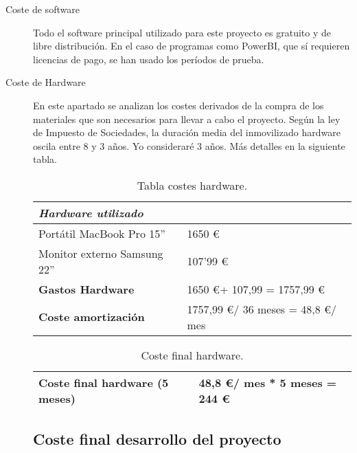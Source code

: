 \begin{description}
	\item[Coste de software] Todo el software principal utilizado para este proyecto es gratuito y de libre distribución. En el caso de programas como PowerBI, que sí requieren licencias de pago, se han usado los períodos de prueba.
	
	\item[Coste de Hardware] En este apartado se analizan los costes derivados de la compra de los materiales que son necesarios para llevar a cabo el proyecto. Según la ley de Impuesto de Sociedades, la duración media del inmovilizado  hardware oscila entre 8 y 3 a\~nos. Yo consideraré 3 años. Más detalles en la siguiente tabla.  
	
	\begin{table}[htbp]
		\begin{center}
			\begin{tabular}{|l|l|}
				\hline
				\emph{Hardware utilizado}&  \\
				\hline \hline
				Portátil MacBook Pro 15'' & 1650 \euro  \\ \hline
				Monitor externo Samsung 22'' &    107'99 \euro\\ \hline
				\textbf{Gastos Hardware}  &   1650 \euro + 107,99  =  1757,99 \euro \\ \hline
				\textbf{Coste amortización}  &  1757,99 \euro  / 36 meses = 48,8 \euro / mes  \\ \hline
			\end{tabular}
			\caption{Tabla costes hardware.}
			\label{tabla:hardware}
		\end{center}
	\end{table}
	
	\begin{table}[htbp]
		\begin{center}
			\begin{tabular}{|l|l|}
				\hline
				\textbf{Coste final hardware} (5 meses)  &  48,8 \euro / mes  *  5 meses = 244 \euro   \\ \hline
			\end{tabular}
			\caption{Coste final hardware.}
			\label{tabla:costefinalhardware}
		\end{center}
	\end{table}
	
	
	\subsection{Coste final desarrollo del proyecto}\label{coste-final}
	

\end{description}
